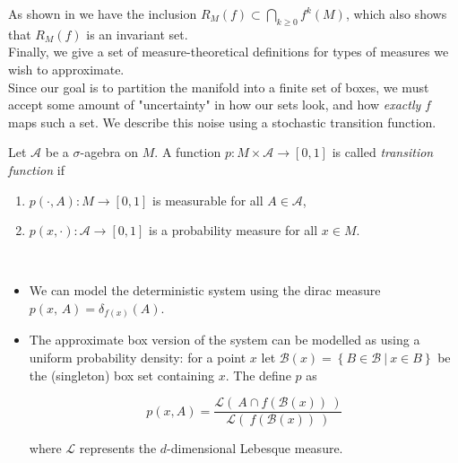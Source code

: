As shown in \cite*{algGAIO} we have the inclusion $R_M(f) \subset \bigcap_{k \geq 0} f^k(M)$,
which also shows that $R_M(f)$ is an invariant set. \\

Finally, we give a set of measure-theoretical definitions for types of measures we wish to 
approximate. \\

Since our goal is to partition the manifold into a finite set of boxes, we must accept some
amount of "uncertainty" in how our sets look, and how \emph{exactly} $f$ maps such a set.
We describe this noise using a stochastic transition function. 

\begin{definition}
    \cite*{attr} Let $\mathcal{A}$ be a $\sigma$-agebra on $M$. A function 
    $p : M \times \mathcal{A} \to [0,1]$ is called \emph{transition function} if

    \begin{enumerate}
        \item $p(\cdot, A) : M \to [0,1]$ is measurable for all $A \in \mathcal{A}$,
        \item $p(x, \cdot) : \mathcal{A} \to [0,1]$ is a probability measure for all $x \in M$.
    \end{enumerate}

\end{definition}

\begin{example}\
    
    \begin{itemize}
        \item\label{ex:q} \cite*{attr} We can model the deterministic system using the dirac 
        measure $p(x,\, A) = \delta_{f(x)}(A)$. 
        \item The approximate box version of the system can be modelled as using a uniform 
        probability density: for a point $x$ let 
        $\mathcal{B}(x) = \left\{ B \in \mathcal{B}\ \vert\ x \in B \right\}$ be the 
        (singleton) box set containing $x$. The define $p$ as 

        \begin{equation}
            p(x, A) = \frac{
                \mathcal{L} (\ A \cap f(\mathcal{B}(x))\ )
            }{
                \mathcal{L} (\ f(\mathcal{B}(x))\ )
            }
        \end{equation}

        where $\mathcal{L}$ represents the $d$-dimensional Lebesque measure.
    
    \end{itemize}

\end{example}

